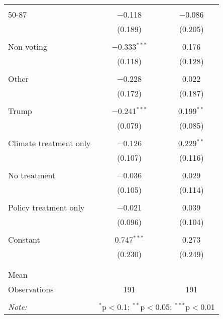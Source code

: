 \begin{tabular}{@{\extracolsep{5pt}}lcc}
  & & \\ 
 50-87 & $-$0.118 & $-$0.086 \\ 
  & (0.189) & (0.205) \\ 
  & & \\ 
 Non voting & $-$0.333$^{***}$ & 0.176 \\ 
  & (0.118) & (0.128) \\ 
  & & \\ 
 Other & $-$0.228 & 0.022 \\ 
  & (0.172) & (0.187) \\ 
  & & \\ 
 Trump & $-$0.241$^{***}$ & 0.199$^{**}$ \\ 
  & (0.079) & (0.085) \\ 
  & & \\ 
 Climate treatment only & $-$0.126 & 0.229$^{**}$ \\ 
  & (0.107) & (0.116) \\ 
  & & \\ 
 No treatment & $-$0.036 & 0.029 \\ 
  & (0.105) & (0.114) \\ 
  & & \\ 
 Policy treatment only & $-$0.021 & 0.039 \\ 
  & (0.096) & (0.104) \\ 
  & & \\ 
 Constant & 0.747$^{***}$ & 0.273 \\ 
  & (0.230) & (0.249) \\ 
  & & \\ 
\hline \\[-1.8ex] 
Mean &  &  \\ 
Observations & 191 & 191 \\ 
\hline 
\hline \\[-1.8ex] 
\textit{Note:}  & \multicolumn{2}{r}{$^{*}$p$<$0.1; $^{**}$p$<$0.05; $^{***}$p$<$0.01} \\ 
\end{tabular} 
